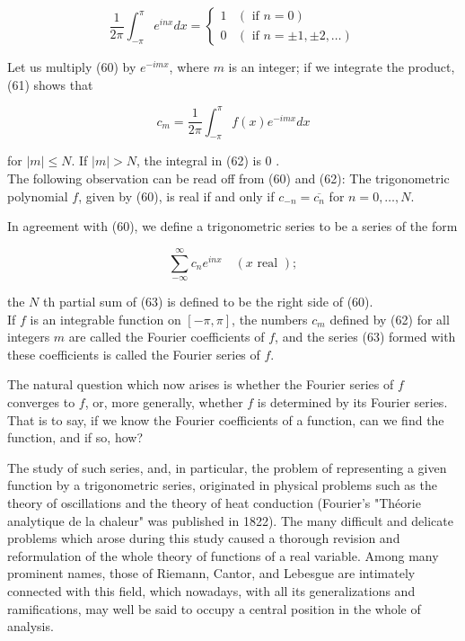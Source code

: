 \documentclass[10pt]{article}
\begin{document}
\[
\frac{1}{2 \pi} \int_{-\pi}^{\pi} e^{i n x} d x= \begin{cases}1 & (\text { if } n=0)  \tag{61}\\ 0 & (\text { if } n= \pm 1, \pm 2, \ldots)\end{cases}
\]

Let us multiply (60) by $e^{-i m x}$, where $m$ is an integer; if we integrate the product, (61) shows that


\begin{equation*}
c_{m}=\frac{1}{2 \pi} \int_{-\pi}^{\pi} f(x) e^{-i m x} d x \tag{62}
\end{equation*}


for $|m| \leq N$. If $|m|>N$, the integral in (62) is 0 .\\
The following observation can be read off from (60) and (62): The trigonometric polynomial $f$, given by (60), is real if and only if $c_{-n}=\overline{c_{n}}$ for $n=0, \ldots, N$.

In agreement with (60), we define a trigonometric series to be a series of the form


\begin{equation*}
\sum_{-\infty}^{\infty} c_{n} e^{i n x} \quad(x \text { real }) ; \tag{63}
\end{equation*}


the $N$ th partial sum of (63) is defined to be the right side of (60).\\
If $f$ is an integrable function on $[-\pi, \pi]$, the numbers $c_{m}$ defined by (62) for all integers $m$ are called the Fourier coefficients of $f$, and the series (63) formed with these coefficients is called the Fourier series of $f$.

The natural question which now arises is whether the Fourier series of $f$ converges to $f$, or, more generally, whether $f$ is determined by its Fourier series. That is to say, if we know the Fourier coefficients of a function, can we find the function, and if so, how?

The study of such series, and, in particular, the problem of representing a given function by a trigonometric series, originated in physical problems such as the theory of oscillations and the theory of heat conduction (Fourier's "Théorie analytique de la chaleur" was published in 1822). The many difficult and delicate problems which arose during this study caused a thorough revision and reformulation of the whole theory of functions of a real variable. Among many prominent names, those of Riemann, Cantor, and Lebesgue are intimately connected with this field, which nowadays, with all its generalizations and ramifications, may well be said to occupy a central position in the whole of analysis.
\end{document}
